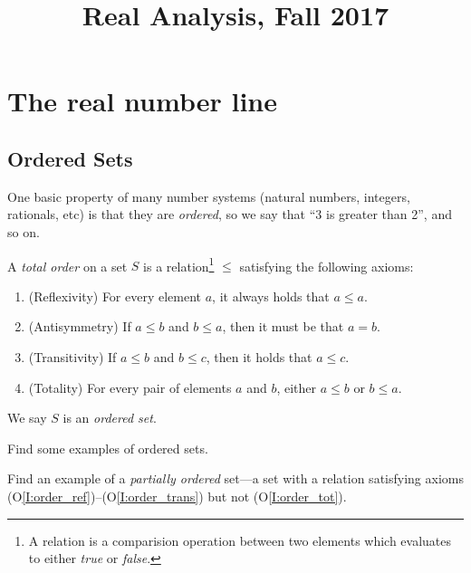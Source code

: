 \documentclass{book}
\title{Real Analysis, Fall 2017}
\begin{document}
\maketitle



\chapter{The real number line} \label{Ch:real}
\section{Ordered Sets} \label{S:ordered}
One basic property of many number systems (natural numbers, integers, rationals, etc) is that they are {\em ordered}, 
so we say that ``3 is greater than 2'', and so on. 
\begin{defn}
A {\em total order} on a set $S$ is a relation\footnote{A relation is a
comparision operation between two elements which evaluates to either {\em true}
or {\em false}.} $\leq$ satisfying the following axioms:
\begin{enumerate}
\item (Reflexivity) For every element $a$, it always holds that $a \leq a$. 
\label{I:order_ref}
\item (Antisymmetry) If $a \leq b$ and $b \leq a$, then it must be that $a = b$.
\label{I:order_anti}
\item (Transitivity) If $a \leq b$ and $b \leq c$, then it holds that $a \leq c$. 
\label{I:order_trans}
\item (Totality) For every pair of elements $a$ and $b$, either $a \leq b$ or $b \leq a$. 
\label{I:order_tot}
\end{enumerate}
We say $S$ is an {\em ordered set}.
\label{D:order}
\end{defn}

\begin{ex}
Find some examples of ordered sets.
\label{Ex:ordered_ex}
\end{ex}

\begin{ex}
Find an example of a {\em partially ordered} set---a set with a relation satisfying axioms (O\ref{I:order_ref})--(O\ref{I:order_trans}) but not (O\ref{I:order_tot}).
\label{Ex:part_ordered_ex}
\end{ex}
\end{document}
